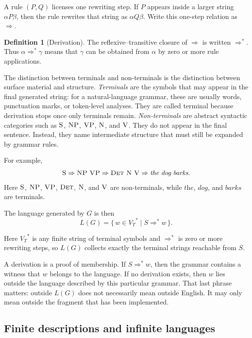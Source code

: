 \documentclass[11pt]{article}
\theoremstyle{definition}
\newtheorem{definition}{Definition}[section]
\theoremstyle{plain}
\theoremstyle{remark}
\newcommand{\Star}[1]{{#1}^{*}}
\newcommand{\derives}{\Rightarrow}
\newcommand{\derivesstar}{\Rightarrow^{*}}
\begin{document}
A rule $(P,Q)$ licenses one rewriting step. If $P$ appears inside a larger string
$\alpha P \beta$, then the rule rewrites that string as $\alpha Q \beta$. Write this
one-step relation as $\derives$.

\begin{definition}[Derivation]
The reflexive--transitive closure of $\derives$ is written $\derivesstar$. Thus
$\alpha \derivesstar \gamma$ means that $\gamma$ can be obtained from $\alpha$ by zero or
more rule applications.
\end{definition}

The distinction between terminals and non-terminals is the distinction between
surface material and structure. \emph{Terminals} are the symbols that may appear
in the final generated string: for a natural-language grammar, these are usually
words, punctuation marks, or token-level analyses. They are called terminal
because derivation stops once only terminals remain. \emph{Non-terminals} are
abstract syntactic categories such as \(\textsc{S}\), \(\textsc{NP}\),
\(\textsc{VP}\), \(\textsc{N}\), and \(\textsc{V}\). They do not appear in the
final sentence. Instead, they name intermediate structure that must still be
expanded by grammar rules.

For example,
\[
\textsc{S}
\Rightarrow \textsc{NP}\ \textsc{VP}
\Rightarrow \textsc{Det}\ \textsc{N}\ \textsc{V}
\Rightarrow \textit{the}\ \textit{dog}\ \textit{barks}.
\]
Here \(\textsc{S}\), \(\textsc{NP}\), \(\textsc{VP}\), \(\textsc{Det}\),
\(\textsc{N}\), and \(\textsc{V}\) are non-terminals, while
\(\textit{the}\), \(\textit{dog}\), and \(\textit{barks}\) are terminals.

The language generated by $G$ is then
\[
  L(G) = \{\, w \in \Star{V_T} \mid S \derivesstar w \,\}.
\]

Here $\Star{V_T}$ is any finite string of terminal symbols and $\derivesstar$ is zero or
more rewriting steps, so $L(G)$ collects exactly the terminal strings reachable from $S$.

A derivation is a proof of membership. If $S \derivesstar w$, then the grammar contains a
witness that $w$ belongs to the language. If no derivation exists, then $w$ lies outside the
language described by this particular grammar. That last phrase matters: outside $L(G)$ does
not necessarily mean outside English. It may only mean outside the fragment that has been
implemented.

\subsection{Finite descriptions and infinite languages}
\end{document}
